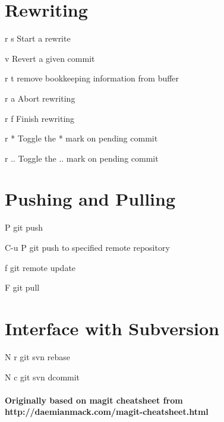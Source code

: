 \documentclass[11pt,a4paper]{article}
\begin{document}
\begin{multicols}{2}
\section{Rewriting}
\begin{eqlist}
\item[r s] Start a rewrite
\item[v] Revert a given commit
\item[r t] remove bookkeeping information from buffer
\item[r a] Abort rewriting
\item[r f] Finish rewriting
\item[r *] Toggle the * mark on pending commit
\item[r ..] Toggle the .. mark on pending commit
\end{eqlist}

\section{Pushing and Pulling}
\begin{eqlist}
\item[P] git push
\item[C-u P] git push to specified remote repository
\item[f] git remote update
\item[F] git pull
\end{eqlist}

\section{Interface with Subversion}
\begin{eqlist}
\item[N r] git svn rebase
\item[N c] git svn dcommit
\end{eqlist}

\end{multicols}

\paragraph{Originally based on magit cheatsheet from
  http://daemianmack.com/magit-cheatsheet.html} %
\end{document}

